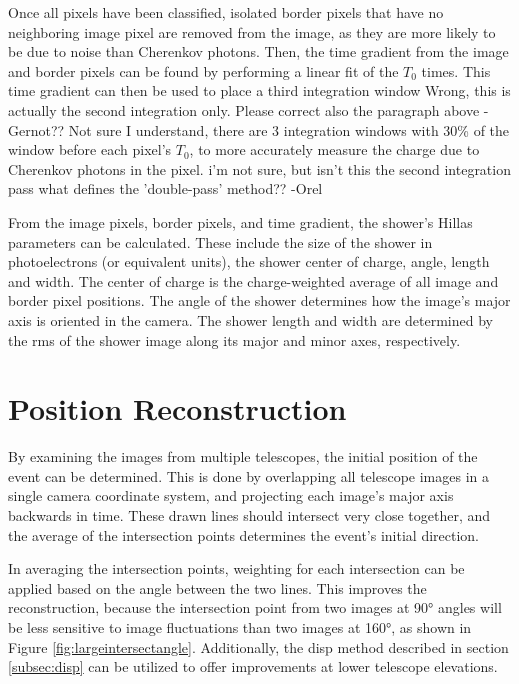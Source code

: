   Once all pixels have been classified, isolated border pixels that have no neighboring image pixel are removed from the image, as they are more likely to be due to noise than Cherenkov photons.
  Then, the time gradient from the image and border pixels can be found by performing a linear fit of the $T_{0}$ times.
  This time gradient can then be used to place a third integration window {\color{red} Wrong, this is actually the second integration only.  Please correct also the paragraph above -Gernot?? Not sure I understand, there are 3 integration windows} with 30\% of the window before each pixel's $T_{0}$, to more accurately measure the charge due to Cherenkov photons in the pixel.
  {\color{red} i'm not sure, but isn't this the second integration pass what defines the 'double-pass' method?? -Orel}

  From the image pixels, border pixels, and time gradient, the shower's Hillas parameters \cite{hillas_params} can be calculated.
  These include the size of the shower in photoelectrons (or equivalent units), the shower center of charge, angle, length and width.
  The center of charge is the charge-weighted average of all image and border pixel positions.
  The angle of the shower determines how the image's major axis is oriented in the camera.
  The shower length and width are determined by the rms of the shower image along its major and minor axes, respectively.

\section{Position Reconstruction}\label{subsec:posrecon}
  By examining the images from multiple telescopes, the initial position of the event can be determined.
  This is done by overlapping all telescope images in a single camera coordinate system, and projecting each image's major axis backwards in time.
  These drawn lines should intersect very close together, and the average of the intersection points determines the event's initial direction.

  In averaging the intersection points, weighting for each intersection can be applied based on the angle between the two lines.
  This improves the reconstruction, because the intersection point from two images at \ang{90} angles will be less sensitive to image fluctuations than two images at \ang{160}, as shown in Figure \ref{fig:largeintersectangle}.
  Additionally, the disp method described in section \ref{subsec:disp} can be utilized to offer improvements at lower telescope elevations.

